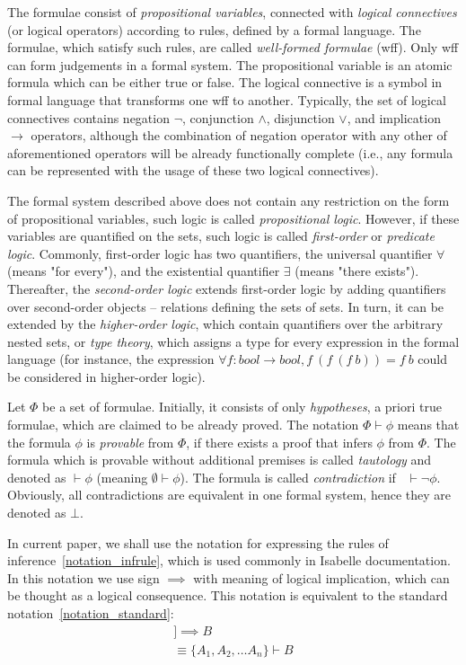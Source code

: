 \documentclass[article]{aaltoseries}
\begin{document}
The formulae consist of \textit{propositional variables}, connected with \textit{logical connectives} (or logical operators) according to rules, defined by a formal language. The formulae, which satisfy such rules, are called \textit{well-formed formulae} (wff). Only wff can form judgements in a formal system. The propositional variable is an atomic formula which can be either true or false. The logical connective is a symbol in formal language that transforms one wff to another. Typically, the set of logical connectives contains negation $\neg$, conjunction $\land$, disjunction $\lor$, and implication $\rightarrow$ operators, although the combination of negation operator with any other of aforementioned operators will be already functionally complete (i.e., any formula can be represented with the usage of these two logical connectives).

The formal system described above does not contain any restriction on the form of propositional variables, such logic is called \textit{propositional logic}. However, if these variables are quantified on the sets, such logic is called \textit{first-order} or \textit{predicate logic}. Commonly, first-order logic has two quantifiers, the universal quantifier $\forall$ (means "for every"), and the existential quantifier $\exists$ (means "there exists"). Thereafter, the \textit{second-order logic} extends first-order logic by adding quantifiers over second-order objects -- relations defining the sets of sets. In turn, it can be extended by the \textit{higher-order logic}, which contain quantifiers over the arbitrary nested sets, or \textit{type theory}, which assigns a type for every expression in the formal language (for instance, the expression $\forall f: bool \rightarrow bool, f\ (f\ (f\ b)) = f\ b$ could be considered in higher-order logic).

Let $\Phi$ be a set of formulae. Initially, it consists of only \textit{hypotheses}, a priori true formulae, which are claimed to be already proved. The notation $\Phi \vdash \phi$ means that the formula $\phi$ is \textit{provable} from $\Phi$, if there exists a proof that infers $\phi$ from $\Phi$. The formula which is provable without additional premises is called \textit{tautology} and denoted as $ \vdash \phi $ (meaning $\emptyset \vdash \phi$). The formula is called \textit{contradiction} if \ $\vdash \neg \phi$. Obviously, all contradictions are equivalent in one formal system, hence they are denoted as $\bot$.

In current paper, we shall use the notation for expressing the rules of inference~\eqref{notation_infrule}, which is used commonly in Isabelle documentation. In this notation we use sign $\implies$ with meaning of logical implication, which can be thought as a logical consequence. This notation is equivalent to the standard notation~\eqref{notation_standard}:
\begin{gather}
[\![ A_{1}; A_{2}; \dots A_{n} ]\!] \implies B 
    \label{notation_infrule}\\
\equiv \{ A_{1}, A_{2}, \dots A_{n} \} \vdash B
    \label{notation_standard}
\end{gather}
\end{document}
